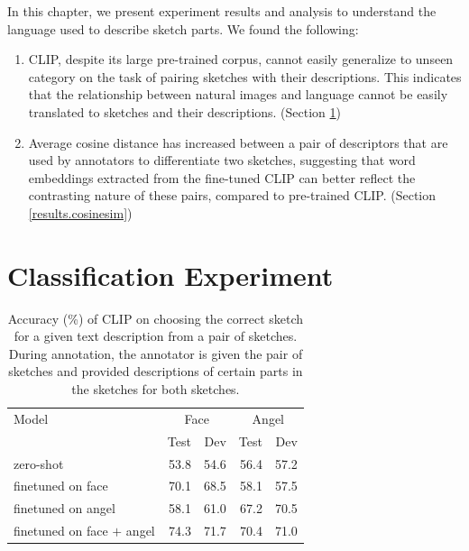 
In this chapter, we present experiment results and analysis to understand the language used to describe sketch parts. We found the following:
\begin{enumerate}
    \item CLIP, despite its large pre-trained corpus, cannot easily generalize to unseen category on the task of pairing sketches with their descriptions. 
    This indicates that the relationship between natural images and language cannot be easily translated to sketches and their descriptions. (Section \ref{results.acc})
    \item Average cosine distance has increased between a pair of descriptors that are used by annotators to differentiate two sketches, suggesting that word embeddings extracted from the fine-tuned CLIP can better reflect the contrasting nature of these pairs, compared to pre-trained CLIP. (Section \ref{results.cosinesim})     
\end{enumerate}

\section{Classification Experiment} \label{results.acc}
    
\begin{table}[htb!]
\begin{minipage}{1\textwidth}
\begin{center}
{\small
\begin{tabular}{l|rrrr}
\toprule
Model & \multicolumn{2}{c}{Face} & \multicolumn{2}{c}{Angel}\\
~ & Test & Dev & Test & Dev \\
\midrule 
zero-shot & 53.8 & 54.6 & 56.4 & 57.2 \\
finetuned on face & 70.1 & 68.5 & 58.1 & 57.5 \\
finetuned on angel & 58.1 & 61.0 & 67.2 & 70.5 \\
finetuned on face $+$ angel & 74.3 & 71.7 & 70.4 & 71.0 \\
\bottomrule
\end{tabular}}
\caption{Accuracy (\%) of CLIP on choosing the correct sketch for a given text description from a pair of sketches. During annotation, the annotator is given the pair of sketches and provided descriptions of certain parts in the sketches for both sketches.}
\label{results.clip.acc}
\end{center}
\end{minipage} 
\end{table}

